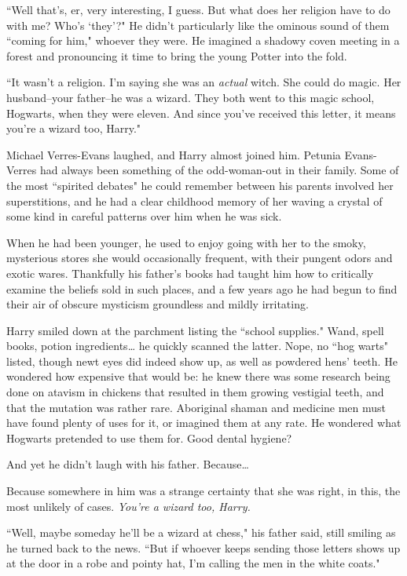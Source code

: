``Well that's, er, very interesting, I guess. But what does her religion have to do with me? Who's `they'?" He didn't particularly like the ominous sound of them ``coming for him," whoever they were. He imagined a shadowy coven meeting in a forest and pronouncing it time to bring the young Potter into the fold.

``It wasn't a religion. I'm saying she was an \emph{actual} witch. She could do magic. Her husband\---your father\---he was a wizard. They both went to this magic school, Hogwarts, when they were eleven. And since you've received this letter, it means you're a wizard too, Harry."

Michael Verres-Evans laughed, and Harry almost joined him. Petunia Evans-Verres had always been something of the odd-woman-out in their family. Some of the most ``spirited debates" he could remember between his parents involved her superstitions, and he had a clear childhood memory of her waving a crystal of some kind in careful patterns over him when he was sick.

When he had been younger, he used to enjoy going with her to the smoky, mysterious stores she would occasionally frequent, with their pungent odors and exotic wares. Thankfully his father's books had taught him how to critically examine the beliefs sold in such places, and a few years ago he had begun to find their air of obscure mysticism groundless and mildly irritating.

Harry smiled down at the parchment listing the ``school supplies." Wand, spell books, potion ingredients{\ldots} he quickly scanned the latter. Nope, no ``hog warts" listed, though newt eyes did indeed show up, as well as powdered hens' teeth. He wondered how expensive that would be: he knew there was some research being done on atavism in chickens that resulted in them growing vestigial teeth, and that the mutation was rather rare. Aboriginal shaman and medicine men must have found plenty of uses for it, or imagined them at any rate. He wondered what Hogwarts pretended to use them for. Good dental hygiene?

And yet he didn't laugh with his father. Because{\ldots}

Because somewhere in him was a strange certainty that she was right, in this, the most unlikely of cases. \emph{You're a wizard too, Harry.}

``Well, maybe someday he'll be a wizard at chess," his father said, still smiling as he turned back to the news. ``But if whoever keeps sending those letters shows up at the door in a robe and pointy hat, I'm calling the men in the white coats."


